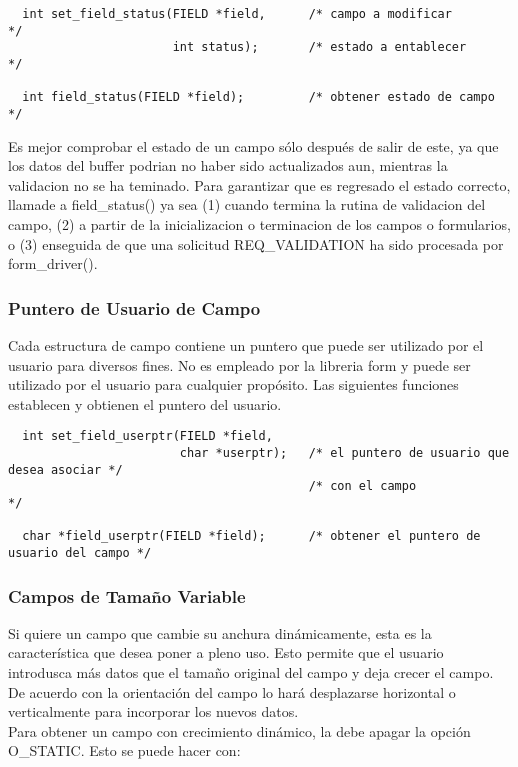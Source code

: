 \documentclass{article}
\begin{document}
\begin{verbatim}
  int set_field_status(FIELD *field,      /* campo a modificar       */
                       int status);       /* estado a entablecer     */

  int field_status(FIELD *field);         /* obtener estado de campo */
\end{verbatim}

Es mejor comprobar el estado de un campo sólo después de salir de este, ya que
los datos del buffer podrian no haber sido actualizados aun, mientras la
validacion no se ha teminado. Para garantizar que es regresado el estado
correcto, llamade a field\_status() ya sea (1) cuando termina la rutina de
validacion del campo, (2) a partir de la inicializacion o terminacion de los
campos o formularios, o (3) enseguida de que una solicitud REQ\_VALIDATION ha
sido procesada por form\_driver().

\subsubsection{Puntero de Usuario de Campo}%
Cada estructura de campo contiene un puntero que puede ser utilizado por el
usuario para diversos fines. No es empleado por la libreria form y puede ser
utilizado por el usuario para cualquier propósito. Las siguientes funciones
establecen y obtienen el puntero del usuario.

\begin{verbatim}
  int set_field_userptr(FIELD *field,
                        char *userptr);   /* el puntero de usuario que desea asociar */
                                          /* con el campo                            */

  char *field_userptr(FIELD *field);      /* obtener el puntero de usuario del campo */
\end{verbatim}

\subsubsection{Campos de Tamaño Variable}%
Si quiere un campo que cambie su anchura dinámicamente, esta es la
característica que desea poner a pleno uso. Esto permite que el usuario
introdusca más datos que el tamaño original del campo y deja crecer el campo.
De acuerdo con la orientación del campo lo hará desplazarse horizontal o
verticalmente para incorporar los nuevos datos.\\

Para obtener un campo con crecimiento dinámico, la debe apagar la opción
O\_STATIC. Esto se puede hacer con:
\end{document}
